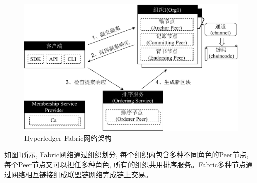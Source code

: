 \begin{figure}[h] %
    \centering %
    \includegraphics[width=1\textwidth]{FIGs/chapter2/hyperledger_fabric.pdf} %
    \caption{Hyperledger Fabric网络架构} %
    \label{hyperledger_fabric} %
\end{figure}%

如图\ref{hyperledger_fabric}所示, Fabric网络通过组织划分, 每个组织内包含多种不同角色的Peer节点, 每个Peer节点又可以担任多种角色, 所有的组织共用排序服务。Fabric多种节点通过网络相互链接组成联盟链网络完成链上交易。

